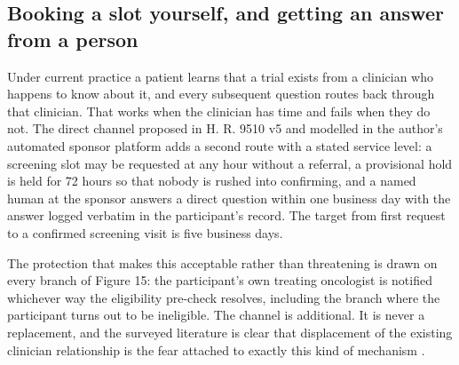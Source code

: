 \vspace{0.30em}

\subsection{Booking a slot yourself, and getting an answer from a person}

Under current practice a patient learns that a trial exists from a clinician who
happens to know about it, and every subsequent question routes back through that
clinician. That works when the clinician has time and fails when they do not.
The direct channel proposed in H. R. 9510 v5 \cite{hr9510billv5} and modelled in
the author's automated sponsor platform \cite{paiautospons} adds a second route
with a stated service level: a screening slot may be requested at any hour
without a referral, a provisional hold is held for 72 hours so that nobody is
rushed into confirming, and a named human at the sponsor answers a direct
question within one business day with the answer logged verbatim in the
participant's record. The target from first request to a confirmed screening
visit is five business days.

The protection that makes this acceptable rather than threatening is drawn on
every branch of Figure 15: the participant's own treating oncologist is notified
whichever way the eligibility pre-check resolves, including the branch where the
participant turns out to be ineligible. The channel is additional. It is never a
replacement, and the surveyed literature is clear that displacement of the
existing clinician relationship is the fear attached to exactly this kind of
mechanism \cite{WuSemiAI2026, TelesAI2026A}.

